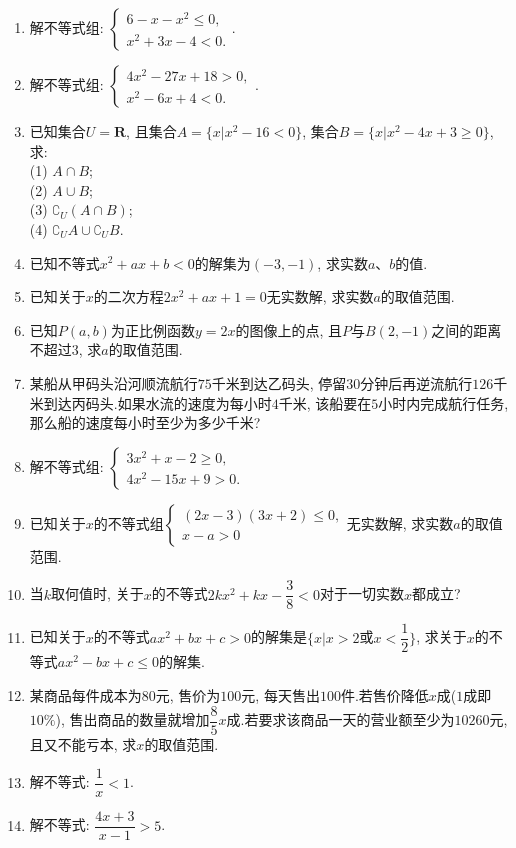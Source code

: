 \documentclass[10pt,a4paper]{article}
\begin{document}
\begin{enumerate}[1.]
\item 解不等式组: $\begin{cases} 6-x-x^2\le 0, \\ x^2+3x-4<0. \end{cases}$.
\item 解不等式组: $\begin{cases} 4x^2-27x+18>0, \\ x^2-6x+4<0. \end{cases}$.
\item 已知集合$U=\mathbf{R}$, 且集合$A=\{x|x^2-16<0\}$, 集合$B=\{x|x^2-4x+3\ge 0\}$, 求:\\
(1) $A\cap B$;\\
(2) $A\cup B$;\\
(3) $\complement _U(A\cap B)$;\\
(4) $\complement _UA\cup \complement _UB$.
\item 已知不等式$x^2+ax+b<0$的解集为$(-3,-1)$, 求实数$a$、$b$的值.
\item 已知关于$x$的二次方程$2x^2+ax+1=0$无实数解, 求实数$a$的取值范围.
\item 已知$P(a,b)$为正比例函数$y=2x$的图像上的点, 且$P$与$B(2,-1)$之间的距离不超过$3$, 求$a$的取值范围.
\item 某船从甲码头沿河顺流航行$75$千米到达乙码头, 停留$30$分钟后再逆流航行$126$千米到达丙码头.如果水流的速度为每小时$4$千米, 该船要在$5$小时内完成航行任务, 那么船的速度每小时至少为多少千米?
\item 解不等式组: $\begin{cases} 3x^2+x-2\ge 0, \\ 4x^2-15x+9>0. \end{cases}$
\item 已知关于$x$的不等式组$\begin{cases} (2x-3)(3x+2)\le 0, \\ x-a>0 \end{cases}$无实数解, 求实数$a$的取值范围.
\item 当$k$取何值时, 关于$x$的不等式$2kx^2+kx-\dfrac 38<0$对于一切实数$x$都成立?
\item 已知关于$x$的不等式$ax^2+bx+c>0$的解集是$\{x|x>2$或$x<\dfrac 12\}$, 求关于$x$的不等式$ax^2-bx+c\le 0$的解集.
\item 某商品每件成本为$80$元, 售价为$100$元, 每天售出$100$件.若售价降低$x$成($1$成即$10\%$), 售出商品的数量就增加$\dfrac 85x$成.若要求该商品一天的营业额至少为$10260$元, 且又不能亏本, 求$x$的取值范围.
\item 解不等式: $\dfrac 1x<1$.
\item 解不等式: $\dfrac{4x+3}{x-1}>5$.

\end{enumerate}
\end{document}
